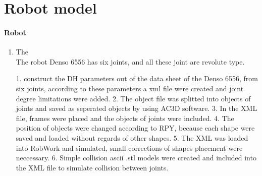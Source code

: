 \section{Robot model}
\label{sec:program}

\paragraph{Robot}

\begin{enumerate}
	\item The \\
	
	The robot Denso 6556 has six joints, and all these joint are revolute type. 

1. construct the DH parameters out of the data sheet of the Denso 6556, from six joints, according to these parameters a xml file were created and joint degree limitations were added.
2. The object file was splitted into objects of joints and saved as seperated objects by using AC3D software.
3. In the XML file, frames were placed and the objects of joints were included.
4. The position of objects were changed according to RPY, because each shape were saved and loaded without regards of other shapes.
5. The XML was loaded into RobWork and simulated, small corrections of shapes placement were neccessary.
6. Simple collision ascii .stl models were created and included into the XML file to simulate collision between joints.
\end{enumerate}
